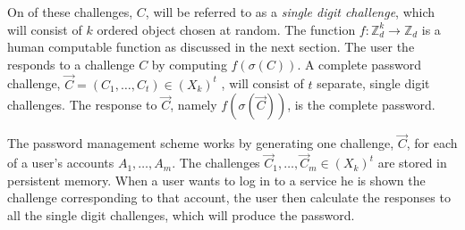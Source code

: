 \par On of these challenges, $C$, will be referred to as a \emph{single digit challenge}, which will consist of $k$ ordered object chosen at random. The function $f: \mathbb{Z}^k_d \rightarrow \mathbb{Z}_d$ is a human computable function as discussed in the next section. The user the responds to a challenge $C$ by computing $f(\sigma(C))$. A complete password challenge, $\vec C = (C_1,\dots,C_t) \in (X_k)^t$ , will consist of $t$ separate, single digit challenges. The response to $\vec C$, namely $f(\sigma(\vec C))$, is the complete password. 
\par The password management scheme works by generating one challenge, $\vec C$, for each of a user's accounts $A_1,\dots,A_m$. The challenges $\vec C_1,\dots,\vec C_m \in (X_k)^t$ are stored in persistent memory. When a user wants to log in to a service he is shown the challenge corresponding to that account, the user then calculate the responses to all the single digit challenges, which will produce the password.

